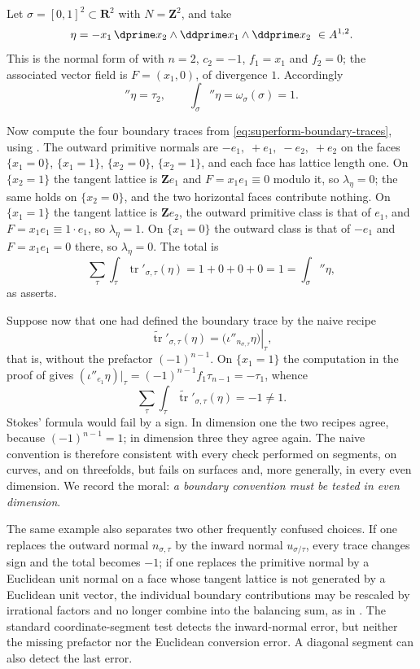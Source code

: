 \begin{example}
\label{ex:ch11-square-wrong-sign}
Let $\sigma=[0,1]^2\subset\mathbf R^2$ with $N=\mathbf Z^2$, and take
\[
 \eta=-x_1\,\dprime x_2\wedge\ddprime x_1\wedge\ddprime x_2
 \ \in A^{1,2}.
\]
This is the normal form of  with $n=2$,
$c_2=-1$, $f_1=x_1$ and $f_2=0$; the associated vector field is
$F=(x_1,0)$, of divergence $1$.  Accordingly
\[
 \dprime\eta=\tau_2,
 \qquad
 \int_\sigma\dprime\eta=\omega_\sigma(\sigma)=1 .
\]

Now compute the four boundary traces from
\eqref{eq:superform-boundary-traces}, using
.  The outward primitive normals are
$-e_1,\;+e_1,\;-e_2,\;+e_2$ on the faces
$\{x_1=0\}$, $\{x_1=1\}$, $\{x_2=0\}$, $\{x_2=1\}$, and each face has
lattice length one.  On $\{x_2=1\}$ the tangent lattice is
$\mathbf Ze_1$ and $F=x_1e_1\equiv0$ modulo it, so $\lambda_\eta=0$; the
same holds on $\{x_2=0\}$, and the two horizontal faces contribute nothing.
On $\{x_1=1\}$ the tangent lattice is $\mathbf Ze_2$, the outward primitive
class is that of $e_1$, and $F=x_1e_1\equiv1\cdot e_1$, so
$\lambda_\eta=1$.  On $\{x_1=0\}$ the outward class is that of $-e_1$ and
$F=x_1e_1=0$ there, so $\lambda_\eta=0$.  The total is
\[
 \sum_\tau\int_\tau\operatorname{tr}'_{\sigma,\tau}(\eta)=1+0+0+0=1
 =\int_\sigma\dprime\eta ,
\]
as  asserts.

Suppose now that one had defined the boundary trace by the naive recipe
\[
 \widetilde{\operatorname{tr}}'_{\sigma,\tau}(\eta)
 =\left.\bigl(\iota''_{n_{\sigma,\tau}}\eta\bigr)\right|_\tau,
\]
that is, without the prefactor $(-1)^{n-1}$.  On $\{x_1=1\}$ the
computation in the proof of  gives
$(\iota''_{e_1}\eta)|_\tau=(-1)^{n-1}f_1\tau_{n-1}=-\tau_1$, whence
\[
 \sum_\tau\int_\tau\widetilde{\operatorname{tr}}'_{\sigma,\tau}(\eta)
 =-1\neq1 .
\]
Stokes' formula would fail by a sign.  In dimension one the two recipes
agree, because $(-1)^{n-1}=1$; in dimension three they agree again.  The
naive convention is therefore consistent with every check performed on
segments, on curves, and on threefolds, but fails on surfaces and, more
generally, in every even dimension.  We
record the moral: \emph{a boundary convention must be tested in even
dimension}.

The same example also separates two other frequently confused choices.  If
one replaces the outward normal $n_{\sigma,\tau}$ by the inward normal
$u_{\sigma/\tau}$, every trace changes sign and the total becomes $-1$; if
one replaces the primitive normal by a Euclidean unit normal on a face
whose tangent lattice is not generated by a Euclidean unit vector, the
individual boundary contributions may be rescaled by irrational factors and no
longer combine into the balancing sum, as in
.  The standard coordinate-segment test
detects the inward-normal error, but neither the missing prefactor nor
the Euclidean conversion error.  A diagonal segment can also detect the
last error.
\end{example}

